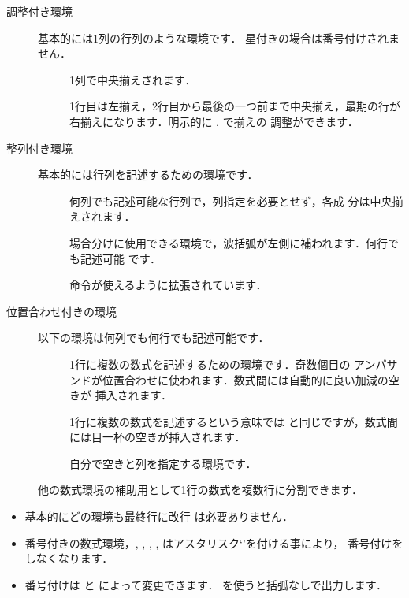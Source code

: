 \begin{description}
 \item[調整付き環境] 基本的には1列の行列のような環境です．
  星付きの場合は番号付けされません．
 \begin{description}
 \item[] 1列で中央揃えされます．
 \item[] 
  1行目は左揃え，2行目から最後の一つ前まで中央揃え，最期の行が
 右揃えになります．明示的に ,  で揃えの
 調整ができます．
 \end{description}
 \item[整列付き環境] 基本的には行列を記述するための環境です．
 \begin{description}
  \item[] 何列でも記述可能な行列で，列指定を必要とせず，各成
  分は中央揃えされます．
  \item[]  
  場合分けに使用できる環境で，波括弧が左側に補われます．何行でも記述可能
  です．
  \item[] 命令が使えるように拡張されています．
 \end{description}

 \item[位置合わせ付きの環境] 以下の環境は何列でも何行でも記述可能です．
 \begin{description}
  \item[] 1行に複数の数式を記述するための環境です．奇数個目の
アンパサンドが位置合わせに使われます．数式間には自動的に良い加減の空きが
挿入されます．
  \item[]  1行に複数の数式を記述するという意味では
と同じですが，数式間には目一杯の空きが挿入されます．
  \item[] 自分で空きと列を指定する環境です．
 \end{description}
  \item[] 他の数式環境の補助用として1行の数式を複数行に分割できます．
\end{description}


\begin{itemize}
\item 基本的にどの環境も最終行に改行 \texttt{\bs\bs} は必要ありません．
\item 番号付きの数式環境，, , , 
  ,  はアスタリスク`\str*'を付ける事により，
番号付けをしなくなります．
\item 番号付けは  と  によって変更できます．
 を使うと括弧なしで出力します．
\end{itemize}


